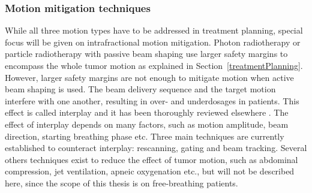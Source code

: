 \subsubsection{Motion mitigation techniques}

While all three motion types have to be addressed in treatment planning, special focus will be given on intrafractional motion mitigation. Photon radiotherapy or particle radiotherapy with passive beam shaping 
use larger safety margins to encompass the whole tumor motion as explained in Section~\ref{treatmentPlanning}. However, larger safety margins are not enough to mitigate motion when active beam shaping is used. The beam delivery 
sequence and the target motion interfere with one another, resulting in over- and underdosages in patients. This effect is called interplay and it has been thoroughly reviewed elsewhere \cite{Phillips1992,Bert2008}. The effect of interplay depends
on many factors, such as motion amplitude, beam direction, starting breathing phase etc. Three main techniques are currently established to counteract interplay: rescanning, gating and beam tracking. Several others techniques exist
to reduce the effect of tumor motion, such as abdominal compression, jet ventilation, apneic oxygenation etc., but will not be described here, since the scope of this thesis is on free-breathing patients.


